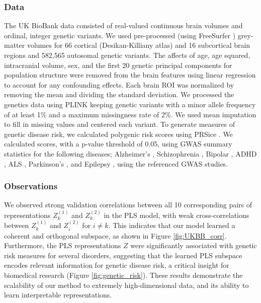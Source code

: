 \subsubsection{Data} The UK BioBank data consisted of real-valued continuous brain volumes and ordinal, integer genetic variants.
We used pre-processed (using FreeSurfer \citep{Fischl2012}) grey-matter volumes for 66 cortical (Desikan-Killiany atlas) and 16 subcortical brain regions and 582,565 autosomal genetic variants.
The affects of age, age squared, intracranial volume, sex, and the first 20 genetic principal components for population structure were removed from the brain features using linear regression to account for any confounding effects.
Each brain ROI was normalized by removing the mean and dividing the standard deviation.
We processed the genetics data using PLINK \citep{Purcell2007} keeping genetic variants with a minor allele frequency of at least 1\%  and a maximum missingness rate of 2\%.
We used mean imputation to fill in missing values and centered each variant.
To generate measures of genetic disease risk, we calculated polygenic risk scores using PRSice \citep{PRSice2014}.
We calculated scores, with a p-value threshold of 0.05, using GWAS summary statistics for the following diseases; Alzheimer's \citep{Lambert2013}, Schizophrenia \citep{Trubetskoy2022}, Bipolar \citep{Mullins2021}, ADHD \citep{Demontis2023}, ALS \citep{Van_Rheenen2021}, Parkinson's \citep{Nalls2019}, and Epilepsy \citep{International_League_Against_Epilepsy_Consortium_on_Complex_Epilepsies2018}, using the referenced GWAS studies.

\subsubsection{Observations}
We observed strong validation correlations between all 10 corresponding pairs of representations \( Z^{(1)}_k \) and \( Z^{(2)}_k \) in the PLS model, with weak cross-correlations between \( Z^{(1)}_k \) and \( Z^{(2)}_i \) for \( i \neq k \).
This indicates that our model learned a coherent and orthogonal subspace, as shown in Figure \ref{fig:UKBB_corr}.
Furthermore, the PLS representations \( Z \) were significantly associated with genetic risk measures for several disorders, suggesting that the learned PLS subspace encodes relevant information for genetic disease risk, a critical insight for biomedical research (Figure \ref{fig:genetic_risk}). These results demonstrate the scalability of our method to extremely high-dimensional data, and its ability to learn interpretable representations.

